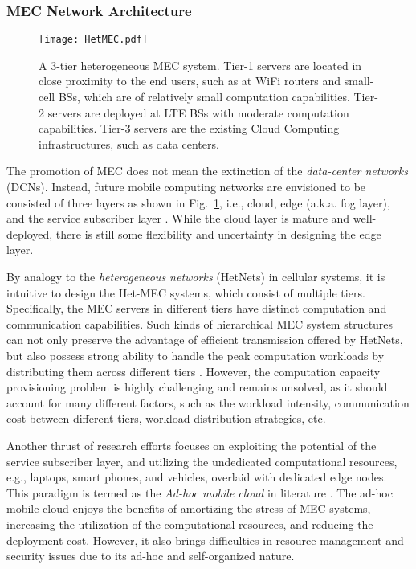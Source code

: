 \documentclass[journal]{IEEEtran}
\begin{document}
{\subsubsection{\textbf{MEC Network Architecture}}\label{Sec:NetArchi}
\begin{figure}[!t]
\begin{center}
   \texttt{[image: HetMEC.pdf]}
\end{center}
\caption{A 3-tier heterogeneous MEC system. Tier-1 servers are located in close proximity to the end users, such as at  WiFi routers and small-cell BSs, which are of relatively small computation capabilities. Tier-2 servers are deployed at LTE BSs with moderate computation capabilities. Tier-3 servers are the existing Cloud Computing infrastructures, such as data centers.}
\label{HetCloud}
\end{figure}
The promotion of MEC does not mean the extinction of the \emph{data-center networks} (DCNs). Instead, future mobile computing networks are envisioned to  be consisted of three layers as shown in Fig.~\ref{HetCloud}, i.e., cloud, edge (a.k.a. fog layer), and the service subscriber layer \cite{lei2013challenges,TLuan1603}. While the cloud layer is mature and well-deployed, there is still some flexibility and uncertainty in designing the edge layer.

By analogy to the \emph{heterogeneous networks} (HetNets) in cellular systems, it is intuitive to design the Het-MEC systems, which consist of multiple tiers. Specifically, the MEC servers in different tiers have distinct computation and communication capabilities. Such kinds of hierarchical MEC system structures can not only preserve the advantage of efficient transmission offered by HetNets, but also possess strong ability to handle the peak computation workloads by distributing them across different tiers \cite{LTongINFOCOM1604}. However, the computation capacity provisioning problem is highly challenging and remains unsolved, as it should account for many different factors, such as the workload intensity, communication cost between different tiers, workload distribution strategies, etc.

Another thrust of research efforts focuses on exploiting the potential of the service subscriber layer, and utilizing the undedicated computational resources, e.g., laptops, smart phones, and vehicles, overlaid with dedicated edge nodes. This paradigm is termed as the \emph{Ad-hoc mobile cloud} in literature \cite{Kirby10,TTHuuCloudCom1412,ShilaWC16,XHouTVT1606}. The ad-hoc mobile cloud enjoys the benefits of amortizing the stress of MEC systems, increasing the utilization of the computational resources, and reducing the deployment cost. However, it also brings difficulties in resource management and security issues due to its ad-hoc and self-organized nature.



}
\end{document}
